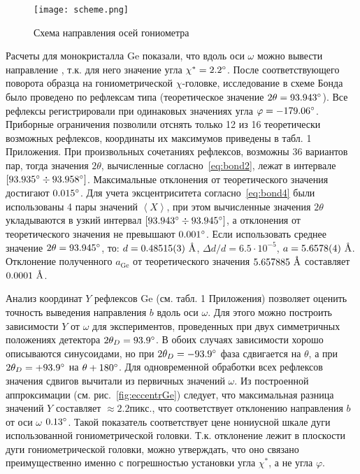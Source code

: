 \begin{figure}[ht!]
    \centering
    \texttt{[image: scheme.png]}
    \caption{Схема направления осей гониометра}%
    \label{fig:scheme}
\end{figure}

Расчеты для монокристалла Ge показали, что вдоль оси $\omega$ можно вывести направление , т.к. для него значение угла $\chi^\ast = 2.2^\circ$.
После соответствующего поворота образца на гониометрической $\chi$-головке, исследование в схеме Бонда было проведено по рефлексам типа  (теоретическое значение $2\theta = 93.943^\circ$).
Все рефлексы регистрировали при одинаковых значениях угла $\varphi = -179.06^\circ$.
Приборные ограничения позволили отснять только 12 из 16 теоретически возможных рефлексов, координаты их максимумов приведены в табл. 1 Приложения.
При произвольных сочетаниях рефлексов, возможны 36 вариантов пар, тогда значения $2\theta$, вычисленные согласно~\ref{eq:bond2}, лежат в интервале $[93.935^\circ\div93.958^\circ]$.
Максимальные отклонения от теоретического значения достигают $0.015^\circ$.
Для учета эксцентриситета согласно~\ref{eq:bond4} были использованы 4 пары значений $\left<X\right>$, при этом вычисленные значения $2\theta$ укладываются в узкий интервал $[93.943^\circ\div93.945^\circ]$, а отклонения от теоретического значения не превышают $0.001^\circ$.
Если использовать среднее значение $2\theta = 93.945^\circ$, то: $d = 0.48515 (3)\ \text{\AA}$, $\Delta d / d = 6.5 \cdot 10^{-5}$, $a = 5.6578 (4)\ \text{\AA}$.
Отклонение полученного $a_\text{Ge}$ от теоретического значения $5.657885\ \text{\AA}$ составляет 
$0.0001\ \text{\AA}$.

Анализ координат $Y$ рефлексов Ge (см. табл. 1 Приложения) позволяет оценить точность выведения направления $b$ вдоль оси $\omega$.
Для этого можно построить зависимости $Y$ от $\omega$ для экспериментов, проведенных при двух симметричных положениях детектора $2\theta_D = 93.9^\circ$.
В обоих случаях зависимости хорошо описываются синусоидами, но при $2\theta_D = -93.9^\circ$ фаза сдвигается на $\theta$, а при $2\theta_D = +93.9^\circ$ на $\theta + 180^\circ$.
Для одновременной обработки всех рефлексов значения сдвигов вычитали из первичных значений $\omega$.
Из построенной аппроксимации (см. рис.~\ref{fig:eccentrGe}) следует, что максимальная разница значений $Y$ составляет $\approx 2.2\unit{пикс.}$, что соответствует отклонению направления $b$ от оси $\omega$ $0.13^\circ$.
Такой показатель соответствует цене нониусной шкале дуги использованной гониометрической головки.
Т.к. отклонение лежит в плоскости дуги гониометрической головки, можно утверждать, что оно связано преимущественно именно с погрешностью установки угла $\chi^\ast$, а не угла $\varphi$.

